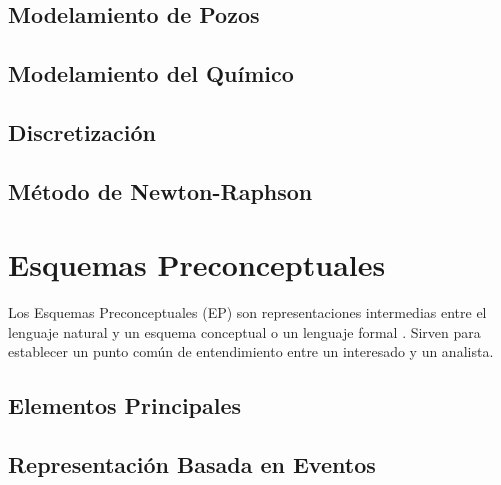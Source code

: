 \subsection{Modelamiento de Pozos}
%
\subsection{Modelamiento del Químico}
%
\subsection{Discretización}

\subsection{Método de Newton-Raphson}
%

\section{Esquemas Preconceptuales}
Los Esquemas Preconceptuales (EP) son representaciones intermedias entre el lenguaje natural y un esquema conceptual o un lenguaje formal \citep{zapata2007phd}. Sirven para establecer un punto común de entendimiento entre un interesado y un analista.
\subsection{Elementos Principales}

\subsection{Representación Basada en Eventos}